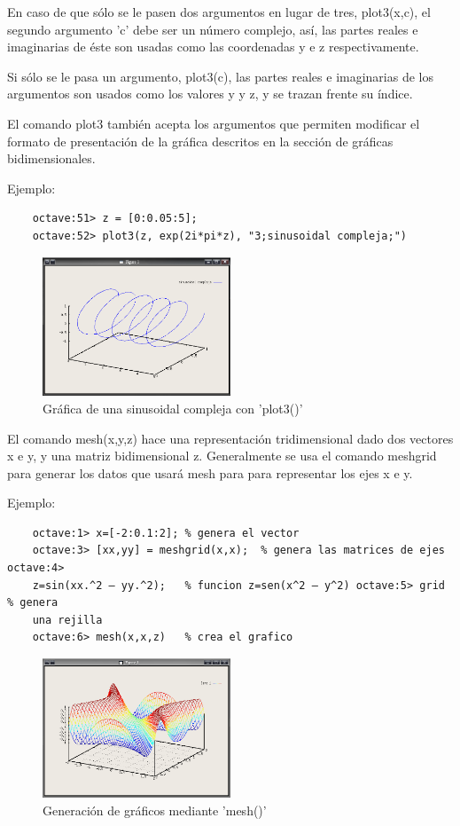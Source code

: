 \documentclass[a4,12pt]{article}
\begin{document}
En caso de que sólo se le pasen dos argumentos en lugar de tres, plot3(x,c), el segundo argumento 'c' debe ser un número complejo, así, las partes reales e imaginarias de éste son usadas como las coordenadas y e z respectivamente.

Si sólo se le pasa un argumento, plot3(c), las partes reales e imaginarias de los argumentos son usados como los valores y y z, y se trazan frente su índice.

El comando plot3 también acepta los argumentos que permiten modificar el formato de presentación de la gráfica descritos en la sección de gráficas bidimensionales.

Ejemplo:\\
\begin{verbatim}
	octave:51> z = [0:0.05:5];
    octave:52> plot3(z, exp(2i*pi*z), "3;sinusoidal compleja;")
\end{verbatim}
\begin{figure}[H]
  \centering
    \includegraphics[width=0.5\textwidth]{graficos/imagen4}
  \caption{Gráfica de una sinusoidal compleja con 'plot3()'}
\end{figure}

El comando mesh(x,y,z) hace una representación tridimensional dado dos vectores x e y,  y  una  matriz  bidimensional  z.  Generalmente  se  usa  el  comando  meshgrid para generar los datos que usará mesh para para representar los ejes x e y.

Ejemplo:\\
\begin{verbatim}
	octave:1> x=[-2:0.1:2];	% genera el vector
	octave:3> [xx,yy] = meshgrid(x,x);	% genera las matrices de ejes octave:4> 
	z=sin(xx.^2 – yy.^2);	% funcion z=sen(x^2 – y^2) octave:5> grid	% genera 
	una rejilla
	octave:6> mesh(x,x,z)	% crea el grafico
\end{verbatim}
\begin{figure}[H]
  \centering
    \includegraphics[width=0.5\textwidth]{graficos/imagen5}
  \caption{Generación de gráficos mediante 'mesh()'}
\end{figure}
\end{document}
